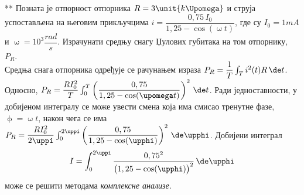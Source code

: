 {\color{red}**}\PID
Позната је  отпорност отпорника $R = 3\unit{k\Upomega}$ и струја
успостављена на његовим прикључцима
$i = \dfrac{0,75\,I_0}{1,25 - \cos(\upomega t)}$,
где су $I_0 = 1\unit{mA}$ и $\upomega 
= 10^3\unit{\dfrac{rad}{s}}$. Израчунати средњу снагу Џулових губитака на том отпорнику, $P_R$.
\\[2mm]

\RESENJE 
Средња снага отпорника одређује се рачунањем израза
$P_R = \dfrac{1}{T}\int_{T} i^2(t) R \, \de t$. Односно,
$P_R = \dfrac{R I_0^2}{T}\int_0^T 
\left(
\dfrac{0,75}{1,25 - \cos(\upomega t)}
\right)^2
 \, \de t$. Ради једноставности, у добијеном интегралу
 се може увести смена која има смисао 
 тренутне фазе, $\upphi = \upomega t$, након чега 
се има
$P_R = \dfrac{R I_0^2}{2\uppi }\int_0^{2\uppi} 
\left(
\dfrac{0,75}{1,25 - \cos(\upphi)}
\right)^2
 \, \de \upphi$. Добијени интеграл 
\begin{equation}
I = \int_0^{2\uppi} 
\frac{0,75^2}{
\bigl(1,25 - \cos(\upphi)\bigr)^2
}
 \, \de \upphi \label{1}
\end{equation} 
 може се решити 
методама \textit{комплексне анализе.}


